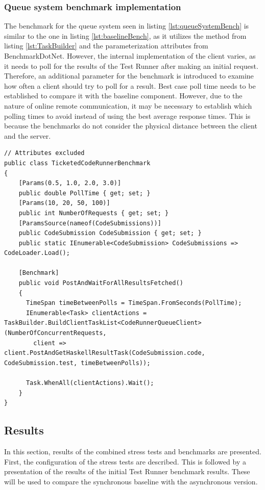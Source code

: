\subsubsection{Queue system benchmark implementation}
The benchmark for the queue system seen in listing \ref{lst:queueSystemBench} is similar to the one in listing \ref{lst:baselineBench}, as it utilizes the method from listing \ref{lst:TaskBuilder} and the parameterization attributes from BenchmarkDotNet. 
However, the internal implementation of the client varies, as it needs to poll for the results of the Test Runner after making an initial request.
Therefore, an additional parameter for the benchmark is introduced to examine how often a client should try to poll for a result.
Best case poll time needs to be established to compare it with the baseline component. 
However, due to the nature of online remote communication, it may be necessary to establish which polling times to avoid instead of using the best average response times.
This is because the benchmarks do not consider the physical distance between the client and the server.
\begin{lstlisting}[language=CSharp, escapechar=~, caption={C\# code showing the benchmark implementation for the asynchronous backend}, label={lst:queueSystemBench}]
// Attributes excluded
public class TicketedCodeRunnerBenchmark
{
    [Params(0.5, 1.0, 2.0, 3.0)] 
    public double PollTime { get; set; }
    [Params(10, 20, 50, 100)] 
    public int NumberOfRequests { get; set; }
    [ParamsSource(nameof(CodeSubmissions))] 
    public CodeSubmission CodeSubmission { get; set; }
    public static IEnumerable<CodeSubmission> CodeSubmissions => CodeLoader.Load();

    [Benchmark]
    public void PostAndWaitForAllResultsFetched()
    {
      TimeSpan timeBetweenPolls = TimeSpan.FromSeconds(PollTime);
      IEnumerable<Task> clientActions = TaskBuilder.BuildClientTaskList<CodeRunnerQueueClient>(NumberOfConcurrentRequests, 
        client => client.PostAndGetHaskellResultTask(CodeSubmission.code, CodeSubmission.test, timeBetweenPolls));

      Task.WhenAll(clientActions).Wait();
    }
}
\end{lstlisting}

\subsection{Results}
In this section, results of the combined stress tests and benchmarks are presented.
First, the configuration of the stress tests are described.
This is followed by a presentation of the results of the initial Test Runner benchmark results.
These will be used to compare the synchronous baseline with the asynchronous version.

